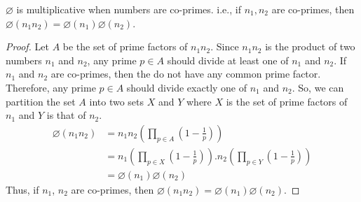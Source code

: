 \vspace{.5cm}
\noindent
\begin{corollary}$\varnothing$ is multiplicative when numbers are co-primes. i.e., if $n_1, n_2$ are co-primes, then $\varnothing(n_1 n_2) = \varnothing(n_1) \varnothing(n_2)$.
\end{corollary}
\begin{proof}
Let $A$ be the set of prime factors of $n_1n_2$. Since $n_1n_2$ is the product of two numbers $n_1$ and $n_2$, any prime $p \in A$ should divide at least one of $n_1$ and $n_2$. If $n_1$ and $n_2$ are co-primes, then the do not have any common prime factor. Therefore, any prime $p \in A$ should divide exactly one of $n_1$ and $n_2$. So, we can partition the set $A$ into two sets $X$ and $Y$ where $X$ is the set of prime factors of $n_1$ and $Y$ is that of $n_2$.
\begin{align*}
    \varnothing(n_1n_2) &= n_1 n_2  (\prod_{p \in A}(1-\frac{1}{p}))\\
    &= n_1 (\prod_{p\in X}(1-\frac{1}{p})). n_2 (\prod_{p\in Y}(1-\frac{1}{p}))\\
    &= \varnothing(n_1) \varnothing(n_2)
\end{align*}
Thus, if $n_1$, $n_2$ are co-primes, then $\varnothing(n_1 n_2) = \varnothing(n_1) \varnothing(n_2)$. \end{proof}



